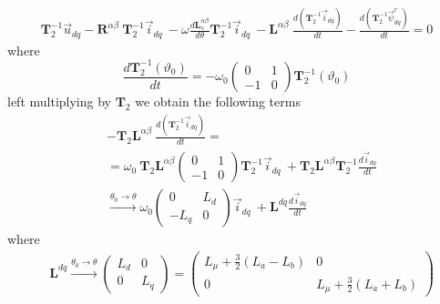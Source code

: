 \documentclass[12pt,a4paper]{scrartcl}
\begin{document}
\begin{onehalfspace}
\begin{equation*}
	\begin{aligned}
		\mathbf{T}_2^{-1}\vec{u}_{dq}-\mathbf{R}^{\alpha\beta}\ \mathbf{T}_2^{-1}\vec{i}_{dq}\ -\omega\frac{d\mathbf{L}_s^{\alpha\beta}}{d\theta}\mathbf{T}_2^{-1}\vec{i}_{dq}\ -\mathbf{L}^{\alpha\beta}\ \frac{d\left( \mathbf{T}_2^{-1}\vec{i}_{dq}\right) }{dt}-\frac{d\left( \mathbf{T}_2^{-1}\vec{\psi}_{dq}^r\right) }{dt} = 0
	\end{aligned} 
\end{equation*}
where
\begin{equation}
	\frac{d\mathbf{T}_2^{-1}(\vartheta_0)}{dt}= -\omega_0\begin{pmatrix} 0 & 1\\ -1 & 0 \end{pmatrix}\mathbf{T}_2^{-1}(\vartheta_0)
\end{equation}
left multiplying by $\mathbf{T}_2$ we obtain the following terms
\begin{equation}
	\begin{aligned}
		&-\mathbf{T}_2\mathbf{L}^{\alpha\beta}\ \frac{d\left( \mathbf{T}_2^{-1}\vec{i}_{dq}\right) }{dt} = \\[6pt]
		&=\omega_0\ \mathbf{T}_2\mathbf{L}^{\alpha\beta}\begin{pmatrix} 0 & 1\\ -1 & 0 \end{pmatrix}\mathbf{T}_2^{-1}\vec{i}_{dq}\ + \mathbf{T}_2\mathbf{L}^{\alpha\beta}\mathbf{T}_2^{-1}\frac{d\vec{i}_{dq}}{dt}  \\[6pt]
		&\xrightarrow{\theta_0\rightarrow\theta} \omega_0\begin{pmatrix} 0 & L_d\\ -L_q & 0 \end{pmatrix}\vec{i}_{dq}\ + \mathbf{L}^{dq}\frac{d\vec{i}_{dq}}{dt}
	\end{aligned}
\end{equation}
where 
\begin{equation}
	\begin{aligned}
		&\mathbf{L}^{dq} \xrightarrow{\theta_0\rightarrow\theta} \begin{pmatrix} L_d & 0\\ 0 & L_q \end{pmatrix} = \begin{pmatrix} L_{\mu}+\frac{3}{2}(L_a-L_b) & 0\\ 0 & L_{\mu}+\frac{3}{2}(L_a+L_b) \end{pmatrix}
	\end{aligned}

\end{equation}
\end{onehalfspace}
\end{document}
